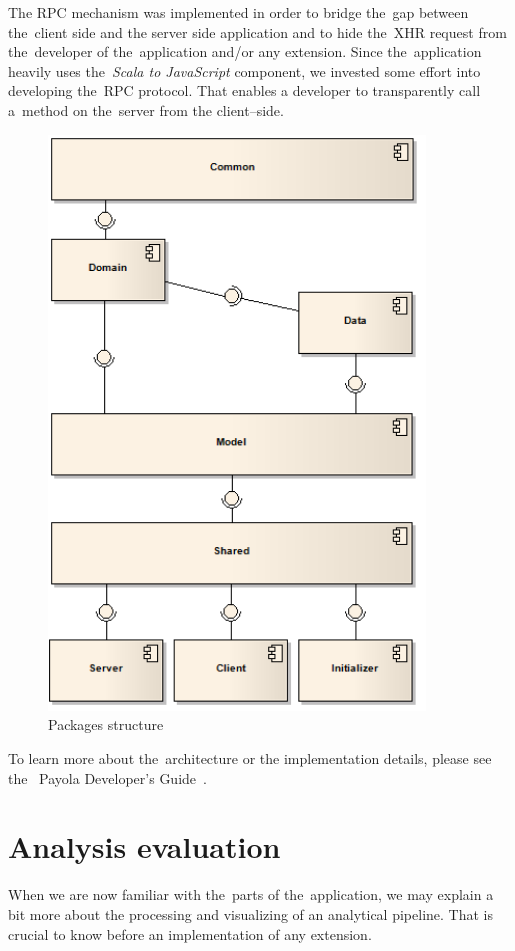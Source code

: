 The RPC mechanism was implemented in order to bridge the~gap between the~client 
side and the server side application and to hide the~XHR request from
the~developer of the~application and/or any extension. Since the~application heavily
uses the~\emph{Scala to JavaScript} component, we invested some effort into developing the~RPC 
protocol. That enables a developer to transparently call a~method on the~server from 
the client--side. 

\begin{figure}
	\centering
	\includegraphics[width=100mm]{images/project_dependencies.png}
	\caption{Packages structure}
	\label{fig:packages-structure}
\end{figure}

To learn more about the~architecture or the implementation details, please see the~
Payola Developer's Guide~\cite{payola:dg}.

\section{Analysis evaluation}
When we are now familiar with the~parts of the~application, we may explain a~
bit more about the processing and visualizing of an analytical pipeline. That is 
crucial to know before an implementation of any extension.

